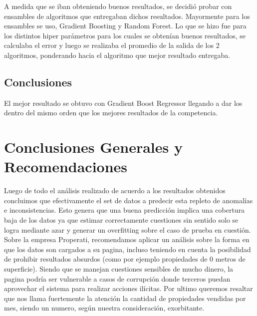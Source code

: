 \documentclass[a4paper, 10pt]{article}
\begin{document}
		A medida que se iban obteniendo buenos resultados, se decidió probar con ensambles de algoritmos que entregaban dichos resultados. Mayormente para los ensambles se uso, Gradient Boosting y Random Forest. Lo que se hizo fue para los distintos hiper parámetros para los cuales se obtenían buenos resultados, se calculaba el error y luego se realizaba el promedio de la salida de los 2 algoritmos, ponderando hacia el algoritmo que mejor resultado entregaba. 
		
		\subsection{Conclusiones}
			El mejor resultado se obtuvo con Gradient Boost Regressor llegando a dar los dentro del mismo orden que los mejores resultados de la competencia.
			
		\section{Conclusiones Generales y Recomendaciones}
		
			Luego de todo el análisis realizado de acuerdo a los resultados obtenidos concluimos que efectivamente el set de datos a predecir esta repleto de anomalías e inconsistencias. Esto genera que una buena predicción implica una cobertura baja de los datos ya que estimar correctamente cuestiones sin sentido solo se logra mediante azar y generar un overfitting sobre el caso de prueba en cuestión.\\
			Sobre la empresa Properati, recomendamos aplicar un análisis sobre la forma en que los datos son cargados a su pagina, incluso teniendo en cuenta la posibilidad de prohibir resultados absurdos (como por ejemplo propiedades de 0 metros de superficie). Siendo que se manejan cuestiones sensibles de mucho dinero, la pagina podría ser vulnerable a casos de corrupción donde terceros puedan aprovechar el sistema para realizar acciones ilícitas. Por ultimo queremos resaltar que nos llama fuertemente la atención la cantidad de propiedades vendidas por mes, siendo un numero, según nuestra consideración, exorbitante.	
			
\end{document}
